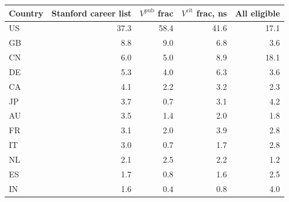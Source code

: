 \begin{tabular}{lrrrr}
\toprule
Country & Stanford career list & $V^{\mathrm{pub}}$ frac & $V^{\mathrm{cit}}$ frac, ns & All eligible \\
\midrule
US & 37.3 & 58.4 & 41.6 & 17.1 \\
GB & 8.8 & 9.0 & 6.8 & 3.6 \\
CN & 6.0 & 5.0 & 8.9 & 18.1 \\
DE & 5.3 & 4.0 & 6.3 & 3.6 \\
CA & 4.1 & 2.2 & 3.2 & 2.3 \\
JP & 3.7 & 0.7 & 3.1 & 4.2 \\
AU & 3.5 & 1.4 & 2.0 & 1.8 \\
FR & 3.1 & 2.0 & 3.9 & 2.8 \\
IT & 3.0 & 0.7 & 1.7 & 2.8 \\
NL & 2.1 & 2.5 & 2.2 & 1.2 \\
ES & 1.7 & 0.8 & 1.6 & 2.5 \\
IN & 1.6 & 0.4 & 0.8 & 4.0 \\
\bottomrule
\end{tabular}
